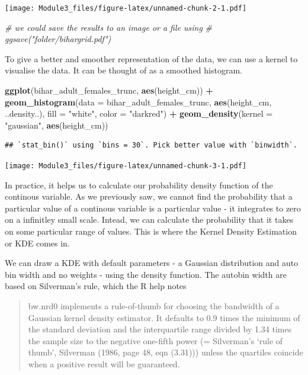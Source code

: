\documentclass[]{book}
\newenvironment{Shaded}{\begin{snugshade}}{\end{snugshade}}
\newcommand{\KeywordTok}[1]{\textcolor[rgb]{0.13,0.29,0.53}{\textbf{#1}}}
\newcommand{\DataTypeTok}[1]{\textcolor[rgb]{0.13,0.29,0.53}{#1}}
\newcommand{\StringTok}[1]{\textcolor[rgb]{0.31,0.60,0.02}{#1}}
\newcommand{\CommentTok}[1]{\textcolor[rgb]{0.56,0.35,0.01}{\textit{#1}}}
\newcommand{\OperatorTok}[1]{\textcolor[rgb]{0.81,0.36,0.00}{\textbf{#1}}}
\newcommand{\NormalTok}[1]{#1}
\theoremstyle{definition}
\theoremstyle{definition}
\theoremstyle{definition}
\theoremstyle{remark}
\begin{document}
\texttt{[image: Module3\_files/figure-latex/unnamed-chunk-2-1.pdf]}

\begin{Shaded}
\begin{Highlighting}[]
\CommentTok{# we could save the results to an image or a file using }
\CommentTok{# ggsave("folder/bihargrid.pdf")}
\end{Highlighting}
\end{Shaded}

To give a better and smoother representation of the data, we can use a
kernel to visualise the data. It can be thought of as a smoothed
histogram.

\begin{Shaded}
\begin{Highlighting}[]
\KeywordTok{ggplot}\NormalTok{(bihar_adult_females_trunc, }\KeywordTok{aes}\NormalTok{(height_cm)) }\OperatorTok{+}\StringTok{ }
\StringTok{  }\KeywordTok{geom_histogram}\NormalTok{(}\DataTypeTok{data =}\NormalTok{ bihar_adult_females_trunc, }\KeywordTok{aes}\NormalTok{(height_cm, ..density..), }\DataTypeTok{fill =} \StringTok{"white"}\NormalTok{, }\DataTypeTok{color =} \StringTok{"darkred"}\NormalTok{) }\OperatorTok{+}
\StringTok{  }\KeywordTok{geom_density}\NormalTok{(}\DataTypeTok{kernel =} \StringTok{"gaussian"}\NormalTok{, }\KeywordTok{aes}\NormalTok{(height_cm))}
\end{Highlighting}
\end{Shaded}

\begin{verbatim}
## `stat_bin()` using `bins = 30`. Pick better value with `binwidth`.
\end{verbatim}

\texttt{[image: Module3\_files/figure-latex/unnamed-chunk-3-1.pdf]}

In practice, it helps us to calculate our probability density function
of the continous variable. As we previously saw, we cannot find the
probability that a particular value of a continous variable is a
particular value - it integrates to zero on a infinitley small scale.
Intead, we can calculate the probability that it takes on some
particular range of values. This is where the Kernel Density Estimation
or KDE comes in.

We can draw a KDE with default parameters - a Gaussian distribution and
auto bin width and no weights - using the density function. The autobin
width are based on Silverman's rule, which the R help notes

\begin{quote}
bw.nrd0 implements a rule-of-thumb for choosing the bandwidth of a
Gaussian kernel density estimator. It defaults to 0.9 times the minimum
of the standard deviation and the interquartile range divided by 1.34
times the sample size to the negative one-fifth power (= Silverman's
`rule of thumb', Silverman (1986, page 48, eqn (3.31))) unless the
quartiles coincide when a positive result will be guaranteed.
\end{quote}
\end{document}
